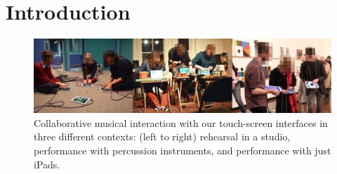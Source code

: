 \documentclass{sigchi}
\begin{document}




\section{Introduction}

\begin{figure}
  \centering
  \includegraphics[width=\linewidth]{figures/three-performance-contexts}
  \caption{Collaborative musical interaction with our touch-screen
    interfaces in three different contexts: (left to right) rehearsal
    in a studio,
    performance with percussion instruments, and performance with just
    iPads.\label{fig:three-performance-contexts}}
\end{figure}
\end{document}
